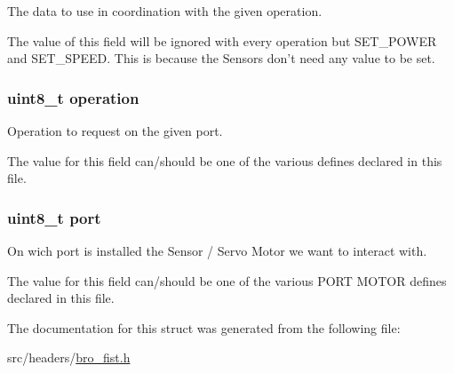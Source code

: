 The data to use in coordination with the given operation. 

The value of this field will be ignored with every operation but SET\_\-POWER and SET\_\-SPEED. This is because the Sensors don't need any value to be set. \hypertarget{structbro__fist__t_a97d486d6926f9137837e1d8ecf0bbfdd}{
\subsubsection[{operation}]{\setlength{\rightskip}{0pt plus 5cm}uint8\_\-t {\bf operation}}}
\label{structbro__fist__t_a97d486d6926f9137837e1d8ecf0bbfdd}


Operation to request on the given port. 

The value for this field can/should be one of the various defines declared in this file. \hypertarget{structbro__fist__t_a2fa54f9024782843172506fadbee2ac8}{
\subsubsection[{port}]{\setlength{\rightskip}{0pt plus 5cm}uint8\_\-t {\bf port}}}
\label{structbro__fist__t_a2fa54f9024782843172506fadbee2ac8}


On wich port is installed the Sensor / Servo Motor we want to interact with. 

The value for this field can/should be one of the various {\ttfamily PORT} {\ttfamily MOTOR} defines declared in this file. 

The documentation for this struct was generated from the following file:\begin{DoxyCompactItemize}
\item 
src/headers/\hyperlink{bro__fist_8h}{bro\_\-fist.h}\end{DoxyCompactItemize}

